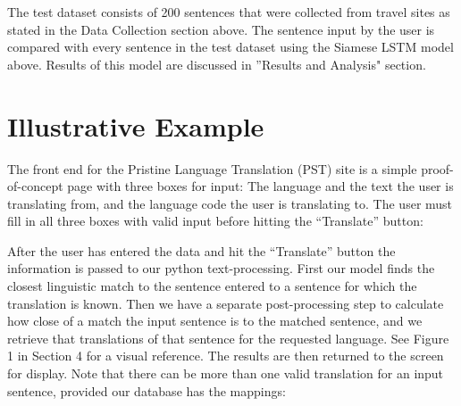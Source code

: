 \documentclass[runningheads]{llncs}
\begin{document}
	The test dataset consists of 200 sentences that were collected from travel sites as stated in the Data Collection section above. The sentence input by the user is compared with every sentence in the test dataset using the Siamese LSTM model above. Results of this model are discussed in ''Results and Analysis" section.
	
	\section{Illustrative Example}
	The front end for the Pristine Language Translation (PST) site is a simple proof-of-concept page with three boxes for input: The language and the text the user is translating from, and the language code the user is translating to. The user must fill in all three boxes with valid input before hitting the ``Translate'' button:

	\begin{minipage}{\linewidth}
		\begin{center}
  			 \noindent{}
			\label{fig:Language Input}
		\end{center}
	\end{minipage}

After the user has entered the data and hit the ``Translate'' button the information is passed to our python text-processing. First our model finds the closest linguistic match to the sentence entered to a sentence for which the translation is known. Then we have a separate post-processing step to calculate how close of a match the input sentence is to the matched sentence, and we retrieve that translations of that sentence for the requested language. See Figure 1 in Section 4 for a visual reference.
The results are then returned to the screen for display. Note that there can be more than one valid translation for an input sentence, provided our database has the mappings:
\end{document}
